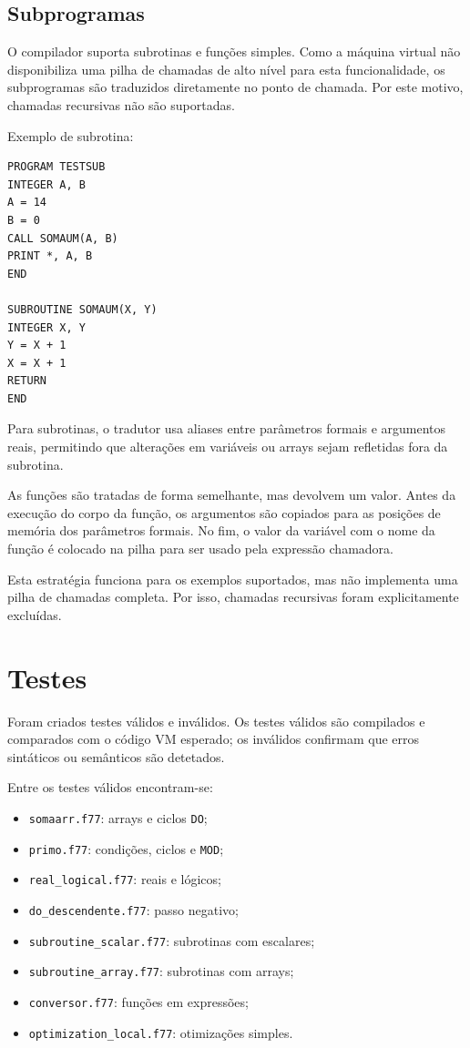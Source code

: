 \documentclass[11pt,a4paper]{article}
\begin{document}
\subsection{Subprogramas}

O compilador suporta subrotinas e funções simples. Como a máquina virtual não disponibiliza uma pilha de chamadas de alto nível para esta funcionalidade, os subprogramas são traduzidos diretamente no ponto de chamada. Por este motivo, chamadas recursivas não são suportadas.

Exemplo de subrotina:

\begin{lstlisting}
PROGRAM TESTSUB
INTEGER A, B
A = 14
B = 0
CALL SOMAUM(A, B)
PRINT *, A, B
END

SUBROUTINE SOMAUM(X, Y)
INTEGER X, Y
Y = X + 1
X = X + 1
RETURN
END
\end{lstlisting}

Para subrotinas, o tradutor usa aliases entre parâmetros formais e argumentos reais, permitindo que alterações em variáveis ou arrays sejam refletidas fora da subrotina.

As funções são tratadas de forma semelhante, mas devolvem um valor. Antes da execução do corpo da função, os argumentos são copiados para as posições de memória dos parâmetros formais. No fim, o valor da variável com o nome da função é colocado na pilha para ser usado pela expressão chamadora.

Esta estratégia funciona para os exemplos suportados, mas não implementa uma pilha de chamadas completa. Por isso, chamadas recursivas foram explicitamente excluídas.

\section{Testes}

Foram criados testes válidos e inválidos. Os testes válidos são compilados e comparados com o código VM esperado; os inválidos confirmam que erros sintáticos ou semânticos são detetados.

Entre os testes válidos encontram-se:

\begin{itemize}
    \item \texttt{somaarr.f77}: arrays e ciclos \texttt{DO};
    \item \texttt{primo.f77}: condições, ciclos e \texttt{MOD};
    \item \texttt{real\_logical.f77}: reais e lógicos;
    \item \texttt{do\_descendente.f77}: passo negativo;
    \item \texttt{subroutine\_scalar.f77}: subrotinas com escalares;
    \item \texttt{subroutine\_array.f77}: subrotinas com arrays;
    \item \texttt{conversor.f77}: funções em expressões;
    \item \texttt{optimization\_local.f77}: otimizações simples.
\end{itemize}
\end{document}
